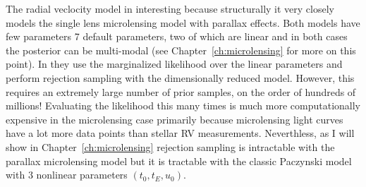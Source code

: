 \documentclass[12pt,dvipsnames]{report}
\begin{document}
The radial veclocity model in \citet{2017ApJ...837...20P} interesting because
structurally it very closely models the single lens microlensing model with
parallax effects. Both models have few parameters 7 default parameters, two of
which are linear and in both cases the posterior can be multi-modal (see
Chapter~\ref{ch:microlensing} for more on this point). In
\citet{2017ApJ...837...20P} they use the marginalized likelihood over the
linear parameters and perform rejection sampling with the dimensionally reduced
model. However, this requires an extremely large number of prior samples, on
the order of hundreds of millions! Evaluating the likelihood this many times is
much more computationally expensive in the microlensing case primarily because
microlensing light curves have a lot more data points than stellar RV
measurements. Neverthless, as I will show in Chapter~\ref{ch:microlensing}
rejection sampling is intractable with the parallax microlensing model but it
is tractable with the classic Paczynski model with 3 nonlinear parameters
$(t_0, t_E, u_0)$.
\end{document}
